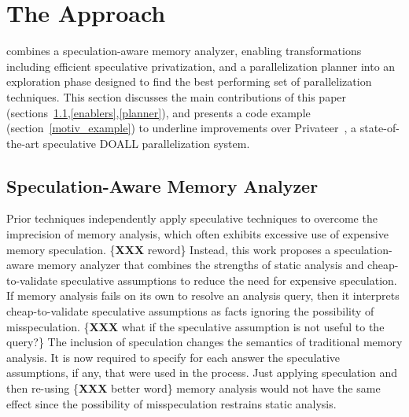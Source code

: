 \section{The \name Approach}

\name combines a speculation-aware memory analyzer, enabling
transformations including efficient speculative privatization, and a
parallelization planner into an exploration phase designed to find the
best performing set of parallelization techniques.  This section
discusses the main contributions of this paper
(sections~\ref{analyzer},\ref{enablers},\ref{planner}), and
presents a code example (section~\ref{motiv_example}) to underline
improvements over Privateer~\cite{johnson:12:pldi}, a state-of-the-art
speculative DOALL parallelization system.

\subsection{Speculation-Aware Memory Analyzer}
\label{analyzer}

%
Prior techniques independently apply speculative techniques to
overcome the imprecision of memory analysis, which often exhibits
excessive use of expensive memory speculation. \{\textbf{XXX} reword\}
%
%
%
%
Instead, this work proposes a speculation-aware memory analyzer that
combines the strengths of static analysis and cheap-to-validate
speculative assumptions to reduce the need for expensive speculation.
If memory analysis fails on its own to resolve an analysis query, then
it interprets cheap-to-validate speculative assumptions as facts
ignoring the possibility of misspeculation. \{\textbf{XXX} what if the
speculative assumption is not useful to the query?\}
%
The inclusion of speculation changes the semantics of traditional memory
analysis. It is now required to specify for each answer the
speculative assumptions, if any, that were used in the process.
%
Just applying speculation and then re-using \{\textbf{XXX} better word\} memory analysis would not
have the same effect since the possibility of misspeculation restrains
static analysis.

%
%


